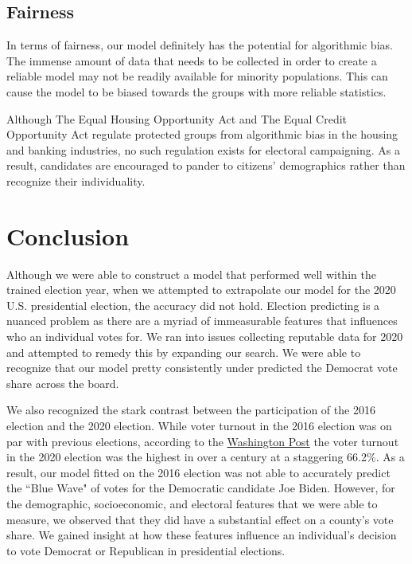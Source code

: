 \documentclass[letterpaper, twocolumn]{article}
\begin{document}
\subsection{Fairness}

In terms of fairness, our model definitely has the potential for algorithmic bias. The immense amount of data that needs to be collected in order to create a reliable model may not be readily available for minority populations. This can cause the model to be biased towards the groups with more reliable statistics. 

Although The Equal Housing Opportunity Act and The Equal Credit Opportunity Act regulate protected groups from algorithmic bias in the housing and banking industries, no such regulation exists for electoral campaigning. As a result, candidates are encouraged to pander to citizens' demographics rather than recognize their individuality.

\section{Conclusion}

Although we were able to construct a model that performed well within the trained election year, when  we attempted to extrapolate our model for the 2020 U.S. presidential election, the accuracy did not hold. Election predicting is a nuanced problem as there are a myriad of immeasurable features that influences who an individual votes for. We ran into issues collecting reputable data for 2020 and attempted to remedy this by expanding our search. We were able to recognize that our model pretty consistently under predicted the Democrat vote share across the board. 

We also recognized the stark contrast between the participation of the 2016 election and the 2020 election. While voter turnout in the 2016 election was on par with previous elections, according to the \href{https://www.washingtonpost.com/graphics/2020/elections/voter-turnout/}{Washington Post} the voter turnout in the 2020 election was the highest in over a century at a staggering 66.2\%. As a result, our model fitted on the 2016 election was not able to accurately predict the ``Blue Wave" of votes for the Democratic candidate Joe Biden. However, for the demographic, socioeconomic, and electoral features that we were able to measure, we observed that they did have a substantial effect on a county's vote share. We gained insight at how these features influence an individual's decision to vote Democrat or Republican in presidential elections.
\end{document}
